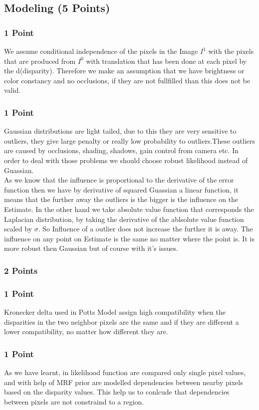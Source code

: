 \newif\ifvimbug
\vimbugfalse

\ifvimbug

\fi


\subsection{Modeling (5 Points)}
\subsubsection{1 Point}
We assume conditional independence of the pixels in the Image $I^1$ with the pixels that are produced from  $I^0$ with translation that has been done at each pixel by the d(disparity). Therefore we  make an assumption that we have brightness or color constancy and no occlusions, if they are not fullfilled than this does not be valid.
\subsubsection{1 Point}
Gaussian distributions are light tailed, due to this they are very sensitive to outliers, they give large penalty or really low probability to outliers.These outliers are caused by occlusions, shading, shadows, gain control from camera etc. In order to deal with those problems we should choose robust likelihood instead of Guassian.\\
As we know that the influence is proportional to the derivative of the error function then we have by derivative of squared Guassian a linear function, it means that the further away the outliers is the bigger is the influence on the Estimate. In the other hand we take absolute value function that corresponds the Laplacian distribution, by taking the derivative of  the ablsolute value function scaled by $\sigma$. So Influence of a outlier does not increase the further it is away. The influence on any point on Estimate is the same no matter where the point is. It is more robust then Gaussian but of course with it's issues.
\subsubsection{2 Points}

\subsubsection{1 Point}
Kronecker delta used in Potts Model assign high compatibility when the disparities in the two neighbor pixels are the same and if they are different a lower compatibility, no matter how different they are.  

\subsubsection{1 Point}
As we have learnt, in likelihood function are compared only single pixel values, and with help of MRF prior are modelled dependencies between nearby pixels based  on the disparity values. This help us to conlcude that dependencies between pixels are not constraind to a region.